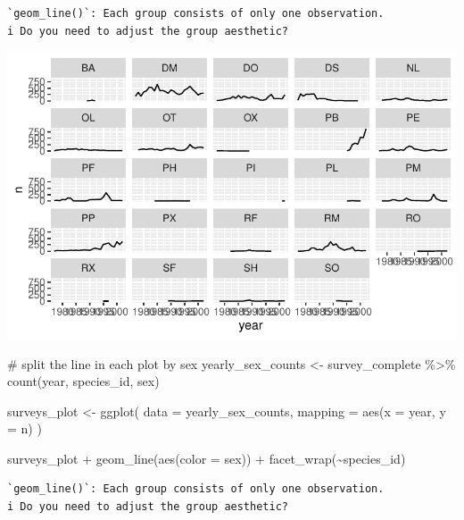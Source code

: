 \documentclass[
  letterpaper,
  DIV=11,
  numbers=noendperiod]{scrreprt}
\newenvironment{Shaded}{\begin{snugshade}}{\end{snugshade}}
\newcommand{\AttributeTok}[1]{\textcolor[rgb]{0.40,0.45,0.13}{#1}}
\newcommand{\CommentTok}[1]{\textcolor[rgb]{0.37,0.37,0.37}{#1}}
\newcommand{\FunctionTok}[1]{\textcolor[rgb]{0.28,0.35,0.67}{#1}}
\newcommand{\NormalTok}[1]{\textcolor[rgb]{0.00,0.23,0.31}{#1}}
\newcommand{\OtherTok}[1]{\textcolor[rgb]{0.00,0.23,0.31}{#1}}
\newcommand{\SpecialCharTok}[1]{\textcolor[rgb]{0.37,0.37,0.37}{#1}}
\begin{document}
\begin{verbatim}
`geom_line()`: Each group consists of only one observation.
i Do you need to adjust the group aesthetic?
\end{verbatim}

\includegraphics{src/notebooks/r_files/figure-pdf/unnamed-chunk-48-4.pdf}

\begin{Shaded}
\begin{Highlighting}[]
\CommentTok{\# split the line in each plot by sex}
\NormalTok{yearly\_sex\_counts }\OtherTok{\textless{}{-}}\NormalTok{ survey\_complete }\SpecialCharTok{\%\textgreater{}\%}
  \FunctionTok{count}\NormalTok{(year, species\_id, sex)}

\NormalTok{surveys\_plot }\OtherTok{\textless{}{-}} \FunctionTok{ggplot}\NormalTok{(}
  \AttributeTok{data =}\NormalTok{ yearly\_sex\_counts,}
  \AttributeTok{mapping =} \FunctionTok{aes}\NormalTok{(}\AttributeTok{x =}\NormalTok{ year, }\AttributeTok{y =}\NormalTok{ n)}
\NormalTok{)}

\NormalTok{surveys\_plot }\SpecialCharTok{+} \FunctionTok{geom\_line}\NormalTok{(}\FunctionTok{aes}\NormalTok{(}\AttributeTok{color =}\NormalTok{ sex)) }\SpecialCharTok{+}
  \FunctionTok{facet\_wrap}\NormalTok{(}\SpecialCharTok{\textasciitilde{}}\NormalTok{species\_id)}
\end{Highlighting}
\end{Shaded}

\begin{verbatim}
`geom_line()`: Each group consists of only one observation.
i Do you need to adjust the group aesthetic?
\end{verbatim}
\end{document}
